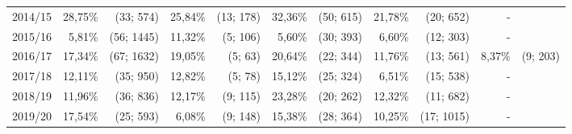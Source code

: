 \begin{table}[H]
\begin{tabular}{|c|*{5}{rr|}}
        2014/15 & 28,75\% &  (33; 574) & 25,84\% & (13; 178) & 32,36\% & (50; 615) & 21,78\% & (20;  652) &      - &          \\
        2015/16 &  5,81\% & (56; 1445) & 11,32\% &  (5; 106) &  5,60\% & (30; 393) &  6,60\% & (12;  303) &      - &          \\
        2016/17 & 17,34\% & (67; 1632) & 19,05\% &   (5; 63) & 20,64\% & (22; 344) & 11,76\% & (13;  561) & 8,37\% & (9; 203) \\
        2017/18 & 12,11\% &  (35; 950) & 12,82\% &   (5; 78) & 15,12\% & (25; 324) &  6,51\% & (15;  538) &      - &          \\
        2018/19 & 11,96\% &  (36; 836) & 12,17\% &  (9; 115) & 23,28\% & (20; 262) & 12,32\% & (11;  682) &      - &          \\
        2019/20 & 17,54\% &  (25; 593) &  6,08\% &  (9; 148) & 15,38\% & (28; 364) & 10,25\% & (17; 1015) &      - &          \\        
        \hline
    \end{tabular}
\end{table}

